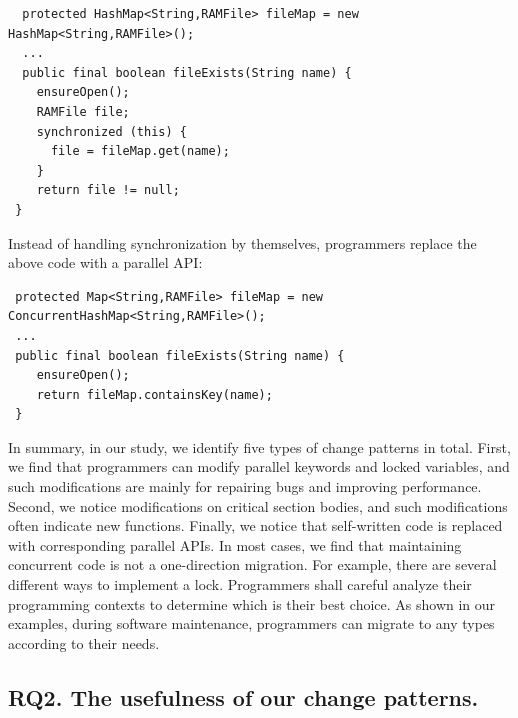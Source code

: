 \begin{lstlisting}
  protected HashMap<String,RAMFile> fileMap = new HashMap<String,RAMFile>();
  ...
  public final boolean fileExists(String name) {
    ensureOpen();
    RAMFile file;
    synchronized (this) {
      file = fileMap.get(name);
    }
    return file != null;
 }
\end{lstlisting}

Instead of handling synchronization by themselves, programmers replace the above code with a parallel API:

\begin{lstlisting}
 protected Map<String,RAMFile> fileMap = new ConcurrentHashMap<String,RAMFile>();
 ...
 public final boolean fileExists(String name) {
    ensureOpen();
    return fileMap.containsKey(name);
 }
\end{lstlisting}

%
%
%
%
%
%

In summary, in our study, we identify five types of change patterns in total. First, we find that programmers can modify parallel keywords and locked variables, and such modifications are mainly for repairing bugs and improving performance. Second, we notice modifications on critical section bodies, and such modifications often indicate new functions. Finally, we notice that self-written code is replaced with corresponding parallel APIs. In most cases, we find that maintaining concurrent code is not a one-direction migration. For example, there are several different ways to implement a lock. Programmers shall careful analyze their programming contexts to determine which is their best choice. As shown in our examples, during software maintenance, programmers can migrate to any types according to their needs.

\subsection{RQ2. The usefulness of our change patterns.}
\label{sec:result:sample}


